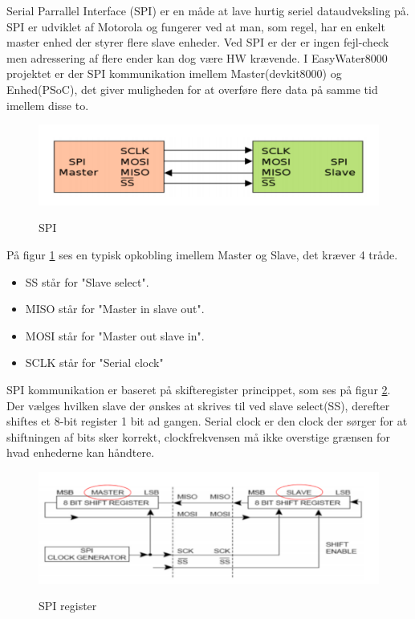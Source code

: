 Serial Parrallel Interface (SPI) er en måde at lave hurtig seriel dataudveksling på. SPI er udviklet af Motorola og fungerer ved at man, som regel, har en enkelt master enhed der styrer flere slave enheder. Ved SPI er der er ingen fejl-check men adressering af flere ender kan dog være HW krævende. I EasyWater8000 projektet er der SPI kommunikation imellem Master(devkit8000)
og Enhed(PSoC), det giver muligheden for at overføre flere data på samme tid imellem disse to.

\begin{figure}[H] \centering
{\includegraphics[width=\textwidth]{filer/design/Billeder/SPI_MASTER_SLAVE}}
\caption{SPI}
\label{lab:SPI}
\raggedright
\end{figure}

På figur \ref{lab:SPI} ses en typisk opkobling imellem Master og Slave, det kræver 4 tråde.
\begin{itemize}
 	\item SS står for "Slave select".
 	\item MISO står for "Master in slave out".
 	\item MOSI står for "Master out slave in". 
	\item SCLK står for "Serial clock" 
\end{itemize}

SPI kommunikation er baseret på skifteregister princippet, som ses på figur \ref{lab:SPI_REGISTER}. Der vælges hvilken slave der 
ønskes at skrives til ved slave select(SS), derefter shiftes et 8-bit register 1 bit ad gangen. Serial clock er den clock der sørger for at
shiftningen af bits sker korrekt, clockfrekvensen må ikke overstige grænsen for hvad enhederne kan håndtere.

\begin{figure}[H] \centering
{\includegraphics[width=\textwidth]{filer/design/Billeder/SPI_REGISTER}}
\caption{SPI register}
\label{lab:SPI_REGISTER}
\raggedright
\end{figure}  

